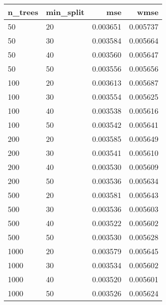 \begin{tabular}{llrr}
\toprule
n\_trees & min\_split &      mse &     wmse \\
\midrule
     50 &        20 & 0.003651 & 0.005737 \\
     50 &        30 & 0.003584 & 0.005664 \\
     50 &        40 & 0.003560 & 0.005647 \\
     50 &        50 & 0.003556 & 0.005656 \\
    100 &        20 & 0.003613 & 0.005687 \\
    100 &        30 & 0.003554 & 0.005625 \\
    100 &        40 & 0.003538 & 0.005616 \\
    100 &        50 & 0.003542 & 0.005641 \\
    200 &        20 & 0.003585 & 0.005649 \\
    200 &        30 & 0.003541 & 0.005610 \\
    200 &        40 & 0.003530 & 0.005609 \\
    200 &        50 & 0.003536 & 0.005634 \\
    500 &        20 & 0.003581 & 0.005643 \\
    500 &        30 & 0.003536 & 0.005603 \\
    500 &        40 & 0.003522 & 0.005602 \\
    500 &        50 & 0.003530 & 0.005628 \\
   1000 &        20 & 0.003579 & 0.005645 \\
   1000 &        30 & 0.003534 & 0.005602 \\
   1000 &        40 & 0.003520 & 0.005601 \\
   1000 &        50 & 0.003526 & 0.005624 \\
\bottomrule
\end{tabular}

